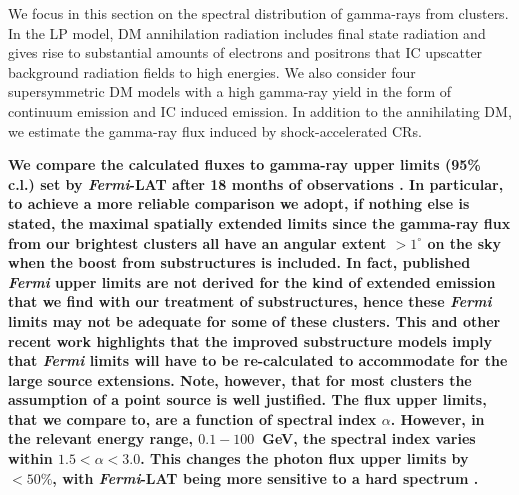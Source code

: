 \documentclass[10pt,aps,pra,reprint,amsmath,amsfonts,amssymb,showpacs,nofootinbib,floatfix]{revtex4-1}
\def\del#1{{}}
\def\C#1{{\bf #1}}
\newcommand{\Fermi}{{\em Fermi}\xspace}
\newcommand{\rmn}{\mathrm}
\newcommand{\bra}{\langle}
\newcommand{\ket}{\rangle}
\newcommand{\dd}{\rmn{d}}
\newcommand{\eg}{E_\gamma}
\begin{document}
We focus in this section on the spectral distribution of gamma-rays
from clusters. In the LP model, DM annihilation radiation includes
final state radiation and gives rise to substantial amounts of
electrons and positrons that IC upscatter background radiation fields
to high energies. We also consider four supersymmetric DM models with
a high gamma-ray yield in the form of continuum emission and IC
induced emission. In addition to the annihilating DM, we estimate the
gamma-ray flux induced by shock-accelerated CRs.

\C{We compare the calculated fluxes to gamma-ray upper limits (95\%
  c.l.) set by \Fermi-LAT after 18 months of observations
  \cite{2010ApJ...717L..71A}. In particular, to achieve a more
  reliable comparison we adopt, if nothing else is stated, the maximal
  spatially extended limits since the gamma-ray flux from our
  brightest clusters all have an angular extent $>1^\circ$ on the sky
  when the boost from substructures is included. In fact, published
  \Fermi upper limits are not derived for the kind of extended
  emission that we find with our treatment of substructures, hence
  these \Fermi limits may not be adequate for some of these
  clusters. This and other recent work highlights that the improved
  substructure models imply that \Fermi limits will have to be
  re-calculated to accommodate for the large source extensions. Note,
  however, that for most clusters the assumption of a point source is
  well justified.  The flux upper limits, that we compare to, are a
  function of spectral index $\alpha$. However, in the relevant energy
  range, $0.1-100$~GeV, the spectral index varies within $1.5 < \alpha
  < 3.0$. This changes the photon flux upper limits by $<50\%$, with
  \Fermi-LAT being more sensitive to a hard spectrum
  \cite{2010ApJ...717L..71A}.}

\del{For simplicity, we adopt the upper limits
  calculated for a spectral index $\alpha=2$ and estimate the change in the
  differential upper limits for each gamma-ray model and energy range using:
\begin{eqnarray}
\frac{\dd F_\gamma}{\dd \eg} &=& K\,\eg^{-\alpha}\,,\quad F_\gamma = 
K\,\eg^{1-\alpha}\,,\nonumber\\
\bra\eg \,F_\gamma\ket &=& K\,
\frac{\displaystyle\int \dd E\, \eg^{1-\alpha}}{\displaystyle\int \dd \eg}
= \frac{K}{2-\alpha}\,
\frac{E_{\gamma,2}^{2-\alpha}-E_{\gamma,1}^{2-\alpha}}{E_{\gamma,2}-E_{\gamma,1}}\,,\nonumber\\
\label{eq:spec_ind_UL}
\end{eqnarray}
where $E_{\gamma,1}$ and $E_{\gamma,2}$ are the upper and lower energy
limits, respectively. In the 1-10~GeV energy range we find that the
upper limits for $($LP,BM,CR$)$ change by a factor
$(1.10,\,0.71,\,1.15)$ where we have used the spectral indices
$(2.20,\,1.22,\,2.24)$, respectively. See
Table~\ref{tab:spectral_index} for additional spectral indices.}
\end{document}
